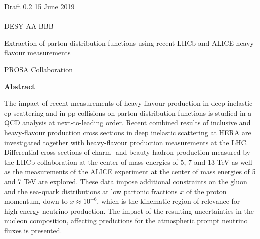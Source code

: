 \documentclass[12pt]{article}
\begin{document}
\begin{titlepage}
\noindent
Draft 0.2  \hfill 15 June 2019\\
\\
DESY AA-BBB %
\\

\vspace{1.3cm}

\begin{center}
  {\bf 

\large

Extraction of parton distribution functions using recent LHCb and ALICE heavy-flavour measurements
  }
  \vspace{1.5cm}

  {\large
    PROSA Collaboration
  }\\

  \vspace{1.2cm}

\end{center}
  \vspace{2.4cm}
\begin{center}
\large
{\bf Abstract}
\vspace{-0.2cm}
\end{center}
The impact of recent measurements of heavy-flavour production in deep inelastic ep scattering and
in pp collisions on parton distribution functions is studied in a QCD analysis at next-to-leading order. 
Recent combined results of inclusive and heavy-flavour production cross sections in deep inelastic scattering at HERA are 
investigated together with heavy-flavour production measurements at the LHC. Differential cross sections of charm- and 
beauty-hadron production measured by the LHCb collaboration at the center of mass energies of 5, 7 and 13 TeV as well 
as the measurements of the ALICE experiment at the center of mass energies of 5 and 7 TeV are explored. 
These data impose additional constraints on the gluon and the sea-quark distributions at low partonic fractions
$x$ of the proton momentum, down to $x\approx10^{-6}$, which is the kinematic region of relevance for high-energy 
neutrino production. The impact of the resulting uncertainties in the nucleon composition, affecting predictions for 
the atmospheric prompt neutrino fluxes is presented.

\vfill
\end{titlepage}


%
%
\newpage
\end{document}
